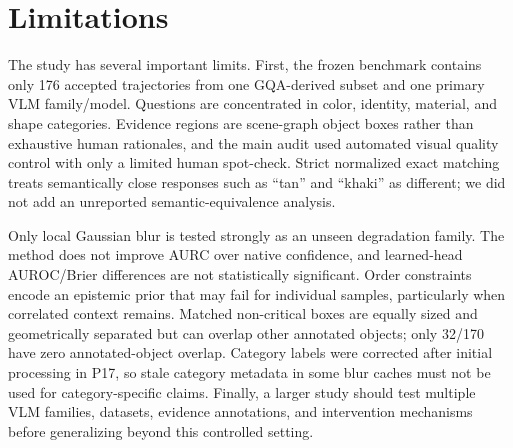 \section{Limitations}
\label{sec:limitations}

The study has several important limits. First, the frozen benchmark contains only 176 accepted trajectories from one GQA-derived subset and one primary VLM family/model. Questions are concentrated in color, identity, material, and shape categories. Evidence regions are scene-graph object boxes rather than exhaustive human rationales, and the main audit used automated visual quality control with only a limited human spot-check. Strict normalized exact matching treats semantically close responses such as ``tan'' and ``khaki'' as different; we did not add an unreported semantic-equivalence analysis.

Only local Gaussian blur is tested strongly as an unseen degradation family. The method does not improve AURC over native confidence, and learned-head AUROC/Brier differences are not statistically significant. Order constraints encode an epistemic prior that may fail for individual samples, particularly when correlated context remains. Matched non-critical boxes are equally sized and geometrically separated but can overlap other annotated objects; only 32/170 have zero annotated-object overlap. Category labels were corrected after initial processing in P17, so stale category metadata in some blur caches must not be used for category-specific claims. Finally, a larger study should test multiple VLM families, datasets, evidence annotations, and intervention mechanisms before generalizing beyond this controlled setting.
